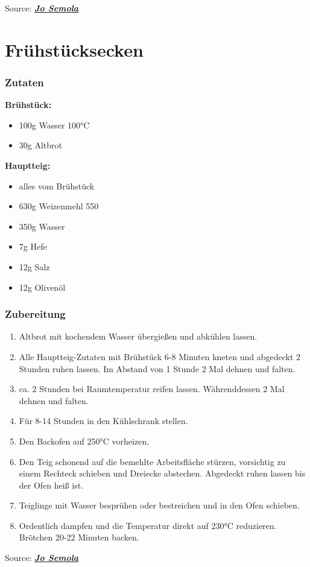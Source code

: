 \documentclass{scrreport}
\begin{document}
Source: \href{https://josemola.de/rezepte/brezel}{\textit{\textbf{Jo Semola}}}

\chapter{Frühstücksecken}

\subsection*{Zutaten}

\textbf{Brühstück:}
\begin{itemize}
	\item 100g Wasser 100°C
	\item 30g Altbrot
\end{itemize}
\textbf{Hauptteig:}
\begin{itemize}
	\item alles vom Brühstück
	\item 630g Weizenmehl 550
	\item 350g Wasser
	\item 7g Hefe
	\item 12g Salz
	\item 12g Olivenöl
\end{itemize}

\subsection*{Zubereitung}

\begin{enumerate}
	\item Altbrot mit kochendem Wasser übergießen und abkühlen lassen.
	\item Alle Hauptteig-Zutaten mit Brühstück 6-8 Minuten kneten und abgedeckt 2 Stunden ruhen lassen.
	      Im Abstand von 1 Stunde 2 Mal dehnen und falten.
	\item ca. 2 Stunden bei Raumtemperatur reifen lassen.
	      Währenddessen 2 Mal dehnen und falten.
	\item Für 8-14 Stunden in den Kühlschrank stellen.
	\item Den Backofen auf 250°C vorheizen.
	\item Den Teig schonend auf die bemehlte Arbeitsfläche stürzen, vorsichtig zu einem Rechteck schieben
	      und Dreiecke abstechen. Abgedeckt ruhen lassen bis der Ofen heiß ist.
	\item Teiglinge mit Wasser besprühen oder bestreichen und in den Ofen schieben.
	\item Ordentlich dampfen und die Temperatur direkt auf 230°C reduzieren. Brötchen 20-22 Minuten backen.
\end{enumerate}

Source: \href{https://josemola.de/rezepte/fruehstuecksecken-mit-altbrot-ueber-nacht}{\textit{\textbf{Jo Semola}}}
\end{document}
